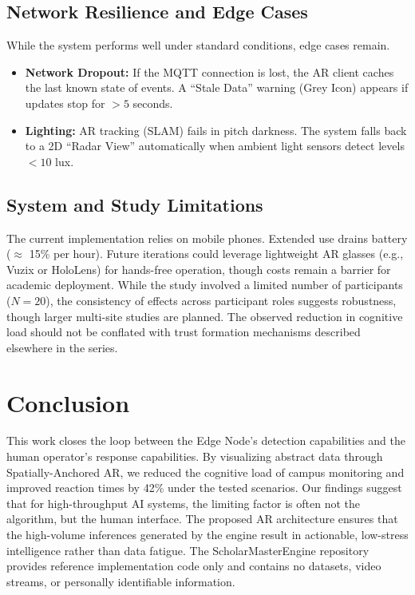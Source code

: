 \documentclass[conference]{IEEEtran}
\begin{document}
\subsection{Network Resilience and Edge Cases}
While the system performs well under standard conditions, edge cases remain.
\begin{itemize}
    \item \textbf{Network Dropout:} If the MQTT connection is lost, the AR client caches the last known state of events. A ``Stale Data'' warning (Grey Icon) appears if updates stop for $>5$ seconds.
    \item \textbf{Lighting:} AR tracking (SLAM) fails in pitch darkness. The system falls back to a 2D ``Radar View'' automatically when ambient light sensors detect levels $<10$ lux.
\end{itemize}

\subsection{System and Study Limitations}
The current implementation relies on mobile phones. Extended use drains battery ($\approx$ 15\% per hour). Future iterations could leverage lightweight AR glasses (e.g., Vuzix or HoloLens) for hands-free operation, though costs remain a barrier for academic deployment. While the study involved a limited number of participants ($N=20$), the consistency of effects across participant roles suggests robustness, though larger multi-site studies are planned. The observed reduction in cognitive load should not be conflated with trust formation mechanisms described elsewhere in the series.

\section{Conclusion}
This work closes the loop between the Edge Node's detection capabilities and the human operator's response capabilities. By visualizing abstract data through Spatially-Anchored AR, we reduced the cognitive load of campus monitoring and improved reaction times by 42\% under the tested scenarios. Our findings suggest that for high-throughput AI systems, the limiting factor is often not the algorithm, but the human interface. The proposed AR architecture ensures that the high-volume inferences generated by the engine result in actionable, low-stress intelligence rather than data fatigue. The ScholarMasterEngine repository provides reference implementation code only and contains no datasets, video streams, or personally identifiable information.
\end{document}
